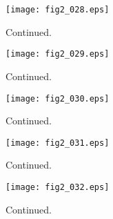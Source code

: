 \documentclass[preprint]{aastex}
\begin{document}
\setcounter{figure}{1}
\begin{figure}[t]
\centering
\texttt{[image: fig2\_028.eps]}
\caption{
Continued. 
}
\label{Fig2}
\end{figure}
\clearpage



\setcounter{figure}{1}
\begin{figure}[t]
\centering
\texttt{[image: fig2\_029.eps]}
\caption{
Continued. 
}
\label{Fig2}
\end{figure}
\clearpage



\setcounter{figure}{1}
\begin{figure}[t]
\centering
\texttt{[image: fig2\_030.eps]}
\caption{
Continued. 
}
\label{Fig2}
\end{figure}
\clearpage



\setcounter{figure}{1}
\begin{figure}[t]
\centering
\texttt{[image: fig2\_031.eps]}
\caption{
Continued. 
}
\label{Fig2}
\end{figure}
\clearpage



\setcounter{figure}{1}
\begin{figure}[t]
\centering
\texttt{[image: fig2\_032.eps]}
\caption{
Continued. 
}
\label{Fig2}
\end{figure}
\clearpage
\end{document}
